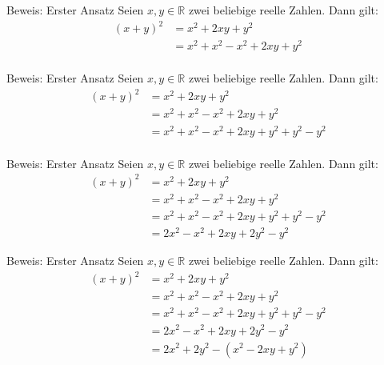 \documentclass[10pt]{beamer}
\def\bR{\mathbb{R}}
\begin{document}
\begin{frame}{Beweis: Erster Ansatz}
    Seien \( x, y \in \bR \) zwei beliebige reelle Zahlen. Dann gilt:
    \begin{align*}
        \left( x + y \right)^{2}
        & = x^{2} + 2xy + y^{2} \\
        & = x^{2} + x^{2} - x^{2} + 2xy + y^{2} \\
    \end{align*}
\end{frame}



\begin{frame}{Beweis: Erster Ansatz}
    Seien \( x, y \in \bR \) zwei beliebige reelle Zahlen. Dann gilt:
    \begin{align*}
        \left( x + y \right)^{2}
        & = x^{2} + 2xy + y^{2} \\
        & = x^{2} + x^{2} - x^{2} + 2xy + y^{2} \\
        & = x^{2} + x^{2} - x^{2} + 2xy + y^{2} + y^{2} - y^{2} \\
    \end{align*}
\end{frame}



\begin{frame}{Beweis: Erster Ansatz}
    Seien \( x, y \in \bR \) zwei beliebige reelle Zahlen. Dann gilt:
    \begin{align*}
        \left( x + y \right)^{2}
        & = x^{2} + 2xy + y^{2} \\
        & = x^{2} + x^{2} - x^{2} + 2xy + y^{2} \\
        & = x^{2} + x^{2} - x^{2} + 2xy + y^{2} + y^{2} - y^{2} \\
        & = 2x^{2} - x^{2} + 2xy + 2y^{2} - y^{2}
    \end{align*}
\end{frame}



\begin{frame}{Beweis: Erster Ansatz}
    Seien \( x, y \in \bR \) zwei beliebige reelle Zahlen. Dann gilt:
    \begin{align*}
        \left( x + y \right)^{2}
        & = x^{2} + 2xy + y^{2} \\
        & = x^{2} + x^{2} - x^{2} + 2xy + y^{2} \\
        & = x^{2} + x^{2} - x^{2} + 2xy + y^{2} + y^{2} - y^{2} \\
        & = 2x^{2} - x^{2} + 2xy + 2y^{2} - y^{2} \\
        & = 2x^{2} + 2y^{2} - \left( x^{2} - 2xy + y^{2} \right)
    \end{align*}
\end{frame}
\end{document}
